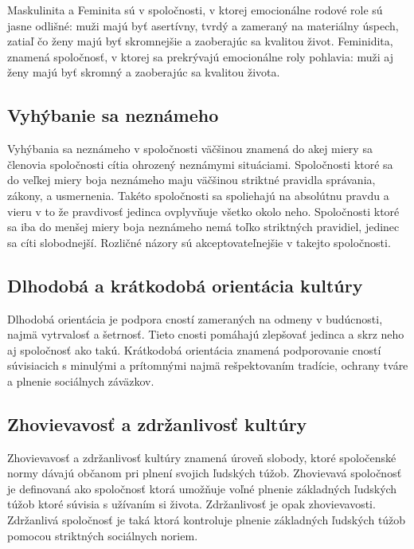 \documentclass[10pt,twoside,slovak,a4paper]{article}
\begin{document}
Maskulinita a Feminita sú v spoločnosti, v ktorej emocionálne rodové role sú jasne odlišné: 
muži majú byť asertívny, tvrdý a zameraný na materiálny úspech, zatiaľ čo ženy majú
byť skromnejšie a zaoberajúc sa kvalitou život. Feminidita, znamená spoločnosť, v ktorej
sa prekrývajú emocionálne roly pohlavia: muži aj ženy majú byť skromný a zaoberajúc
sa kvalitou života.

\subsection{Vyhýbanie sa neznámeho}\label{kultura:vyhybanie}

Vyhýbania sa neznámeho v spoločnosti väčšinou znamená do akej miery sa členovia spoločnosti
cítia ohrozený neznámymi situáciami. Spoločnosti ktoré sa do veľkej miery boja neznámeho
maju väčšinou striktné pravidla správania, zákony, a usmernenia. Takéto spoločnosti sa spoliehajú
na absolútnu pravdu a vieru v to že pravdivosť jedinca ovplyvňuje všetko okolo neho. Spoločnosti
ktoré sa iba do menšej miery boja neznámeho nemá toľko striktných pravidiel, jedinec sa cíti
slobodnejší. Rozličné názory sú akceptovateľnejšie v takejto spoločnosti.

\subsection{Dlhodobá a krátkodobá orientácia kultúry}\label{kultura:cnosti}

Dlhodobá orientácia je podpora cností zameraných na odmeny v budúcnosti, najmä vytrvalosť a šetrnosť.
Tieto cnosti pomáhajú zlepšovať jedinca a skrz neho aj spoločnosť ako takú. Krátkodobá orientácia
znamená podporovanie cností súvisiacich s minulými a prítomnými najmä rešpektovaním tradície, ochrany
tváre a plnenie sociálnych záväzkov.

\subsection{Zhovievavosť a zdržanlivosť kultúry}\label{kultura:obmedzenia}

Zhovievavosť a zdržanlivosť kultúry znamená úroveň slobody, ktoré spoločenské normy
dávajú občanom pri plnení svojich ľudských túžob. Zhovievavá spoločnosť je definovaná
ako spoločnosť ktorá umožňuje voľné plnenie základných ľudských túžob ktoré súvisia s
užívaním si života. Zdržanlivosť je opak zhovievavosti. Zdržanlivá spoločnosť je taká
ktorá kontroluje plnenie základných ľudských túžob pomocou striktných sociálnych noriem.
\end{document}

